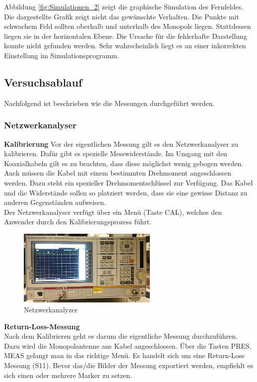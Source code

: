 Abbildung \ref{fig:Simulationen_2} zeigt die graphische Simulation des Fernfeldes. Die dargestellte Grafik zeigt nicht das gewünschte Verhalten. Die Punkte mit schwachem Feld sollten oberhalb und unterhalb des Monopols liegen. Stattdessen liegen sie in der horizontalen Ebene. Die Ursache für die fehlerhafte Darstellung konnte nicht gefunden werden. Sehr wahrscheinlich liegt es an einer inkorrekten Einstellung im Simulationsprogramm.\\

\newpage
\subsection{Versuchsablauf}
Nachfolgend ist beschrieben wie die Messungen durchgeführt werden.

\subsubsection{Netzwerkanalyser}
\textbf{Kalibrierung}
Vor der eigentlichen Messung gilt es den Netzwerkanalyser zu kalibrieren. Dafür gibt es spezielle Messwiderstände. Im Umgang mit den Koaxialkabeln gilt es zu beachten, dass diese möglichst wenig gebogen werden. Auch müssen die Kabel mit einem bestimmten Drehmoment angeschlossen werden. Dazu steht ein spezieller Drehmomentschlüssel zur Verfügung. Das Kabel und die Widerstände sollen so platziert werden, dass sie eine gewisse Distanz zu anderen Gegenständen aufweisen.\\
Der Netzwerkanalyser verfügt über ein Menü (Taste CAL), welches den Anwender durch den Kalibrierungsprozess führt. \\
\vspace{3mm}

\begin{figure}[htbp]
	\centering
	\includegraphics[width=0.6\textwidth]{pic/Messungen/NWA.JPG}
	\caption{Netzwerkanalyzer}
	\label{fig:Netzwerkanalyzer}
\end{figure}

\textbf{Return-Loss-Messung}\\
Nach dem Kalibrieren geht es darum die eigentliche Messung durchzuführen. Dazu wird die Monopolantenne ans Kabel angeschlossen. Über die Tasten PRES, MEAS gelangt man in das richtige Menü. Es handelt sich um eine Return-Loss Messung (S11). Bevor das/die Bilder der Messung exportiert werden, empfiehlt es sich einen oder mehrere Marker zu setzen.

